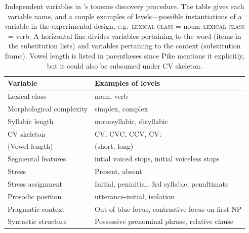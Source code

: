 \documentclass[12pt]{article}
\begin{document}
\begin{table}[!h]
  \centering
  \begin{tabular}{l | l}
    Variable & Examples of levels\\\hline
    Lexical class &  noun, verb\\
    Morphological complexity &  simplex, complex\\
    Syllabic length &  monosyllabic, disyllabic\\
    CV skeleton &  CV, CVC, CCV, CV:\\
    (Vowel length) &  (short, long)\\
    Segmental features &  intial voiced stops, initial
    voiceless stops\\
    Stress &  Present, absent\\
    Stress assignment &  Initial, peninitial, 3rd
    syllable, penultimate\\\hline
    Prosodic position &  utterance-initial, isolation\\
    Pragmatic context &  Out of blue focus, contrastive
    focus on first NP\\
    Syntactic structure &  Possessive prenominal phrase, relative clause\\
  \end{tabular}
  \caption{Independent variables in \citet{Pike:1948}'s toneme
    discovery procedure. The table gives each variable name,
    and a couple examples of levels---possible instantiations of a variable in the
    experimental design, e.g.\ \textsc{lexical class} = noun;
    \textsc{lexical class} = verb. A horizontal line divides variables
    pertaining to the word (items in the substitution lists) and
    variables pertaining to the context (substitution frame). Vowel
    length is listed in parentheses since Pike mentions it explicitly,
    but it could also be subsumed under CV skeleton. }
  \label{tab:pike-iv}
\end{table}
\end{document}
